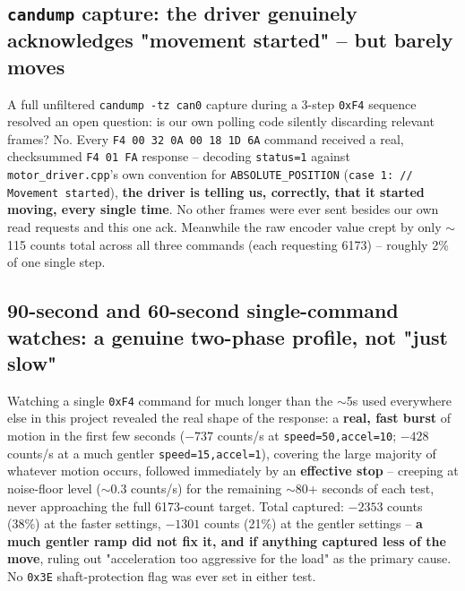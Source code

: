 \documentclass[11pt,letterpaper]{article}
\begin{document}
\subsection{\texttt{candump} capture: the driver genuinely acknowledges "movement started" -- but barely moves}
A full unfiltered \texttt{candump -tz can0} capture during a 3-step \texttt{0xF4} sequence resolved an open question: is our own polling code silently discarding relevant frames? No. Every \texttt{F4 00 32 0A 00 18 1D 6A} command received a real, checksummed \texttt{F4 01 FA} response -- decoding \texttt{status=1} against \texttt{motor\_driver.cpp}'s own convention for \texttt{ABSOLUTE\_POSITION} (\texttt{case 1: // Movement started}), \textbf{the driver is telling us, correctly, that it started moving, every single time}. No other frames were ever sent besides our own read requests and this one ack. Meanwhile the raw encoder value crept by only $\sim$115 counts total across all three commands (each requesting 6173) -- roughly 2\% of one single step.

\subsection{90-second and 60-second single-command watches: a genuine two-phase profile, not "just slow"}
Watching a single \texttt{0xF4} command for much longer than the $\sim$5s used everywhere else in this project revealed the real shape of the response: a \textbf{real, fast burst} of motion in the first few seconds ($-737$ counts/s at \texttt{speed=50,accel=10}; $-428$ counts/s at a much gentler \texttt{speed=15,accel=1}), covering the large majority of whatever motion occurs, followed immediately by an \textbf{effective stop} -- creeping at noise-floor level ($\sim$0.3 counts/s) for the remaining $\sim$80+ seconds of each test, never approaching the full 6173-count target. Total captured: $-2353$ counts (38\%) at the faster settings, $-1301$ counts (21\%) at the gentler settings -- \textbf{a much gentler ramp did not fix it, and if anything captured less of the move}, ruling out "acceleration too aggressive for the load" as the primary cause. No \texttt{0x3E} shaft-protection flag was ever set in either test.
\end{document}
